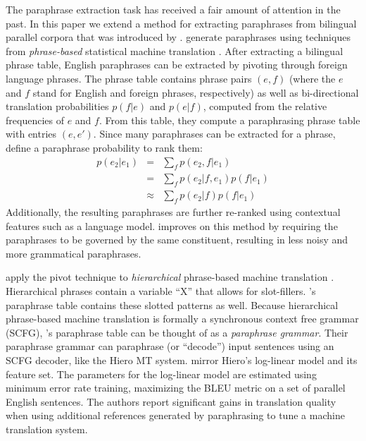 \documentclass[11pt]{article}
\DeclareMathOperator*{\argmax}{arg\,max}
\begin{document}
The paraphrase extraction task has received a fair amount of attention
in the past. In this paper we extend a method for extracting
paraphrases from bilingual parallel corpora that was introduced by
.  generate
paraphrases using techniques from {\it phrase-based} statistical
machine translation \cite{Koehn2003}. After extracting a bilingual
phrase table, English paraphrases can be extracted by pivoting through
foreign language phrases. The phrase table contains phrase pairs $(e,
f)$ (where the $e$ and $f$ stand for English and foreign phrases,
respectively) as well as bi-directional translation probabilities
$p(f | e)$ and $p(e | f)$, computed from the relative frequencies of
$e$ and $f$. From this table, they compute a paraphrasing phrase table
with entries $(e, e')$. Since many paraphrases can be extracted for a
phrase,  define a paraphrase probability
to rank them:
\begin{eqnarray}
  p(e_2|e_1) &=& \sum_f p(e_2,f|e_1)\\
                  &=& \sum_f p(e_2|f,e_1) p(f|e_1) \\
                  &\approx& \sum_f p(e_2|f) p(f|e_1)
\label{paraphrase_prob_eqn}
\end{eqnarray}
Additionally, the resulting paraphrases are further re-ranked using
contextual features such as a language model.
 improves on this method by requiring the
paraphrases to be governed by the same constituent, resulting in less
noisy and more grammatical paraphrases.

 apply the pivot technique to {\it hierarchical}
phrase-based machine translation \cite{Chiang2005}. Hierarchical
phrases contain a variable ``X'' that allows for slot-fillers.
's paraphrase table contains these slotted
patterns as well. Because hierarchical phrase-based machine
translation is formally a synchronous context free grammar (SCFG),
's paraphrase table can be thought of as a {\it
  paraphrase grammar}. Their paraphrase grammar can paraphrase (or
``decode'') input sentences using an SCFG decoder, like the Hiero MT
system.  mirror Hiero's log-linear model and its
feature set. The parameters for the log-linear model are estimated
using minimum error rate training, maximizing the BLEU metric on a set
of parallel English sentences. The authors report significant gains in
translation quality when using additional references generated by
paraphrasing to tune a machine translation system.
\end{document}
